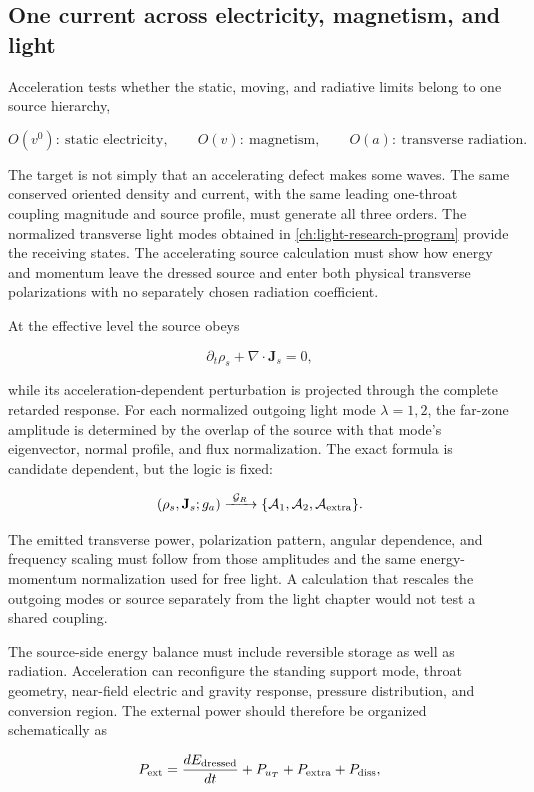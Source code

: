 \subsection{One current across electricity, magnetism, and light}

Acceleration tests whether the static, moving, and radiative limits belong to
one source hierarchy,

\[
O(v^0):\ \text{static electricity},
\qquad
O(v):\ \text{magnetism},
\qquad
O(a):\ \text{transverse radiation}.
\]

The target is not simply that an accelerating defect makes some waves. The same
conserved oriented density and current, with the same leading one-throat
coupling magnitude and source profile, must generate all three orders. The
normalized transverse light modes obtained in
\cref{ch:light-research-program} provide the receiving states. The accelerating
source calculation must show how energy and momentum leave the dressed source
and enter both physical transverse polarizations with no separately chosen
radiation coefficient.

At the effective level the source obeys

\[
\partial_t\rho_s+\nabla\cdot\mathbf J_s=0,
\]

while its acceleration-dependent perturbation is projected through the complete
retarded response. For each normalized outgoing light mode \(\lambda=1,2\),
the far-zone amplitude is determined by the overlap of the source with that
mode's eigenvector, normal profile, and flux normalization. The exact formula is
candidate dependent, but the logic is fixed:

\[
(\rho_s,\mathbf J_s;g_a)
\xrightarrow{\ \mathcal G_R\ }
\{\mathcal A_1,\mathcal A_2,\mathcal A_{\rm extra}\}.
\]

The emitted transverse power, polarization pattern, angular dependence, and
frequency scaling must follow from those amplitudes and the same energy-momentum
normalization used for free light. A calculation that rescales the outgoing
modes or source separately from the light chapter would not test a shared
coupling.

The source-side energy balance must include reversible storage as well as
radiation. Acceleration can reconfigure the standing support mode, throat
geometry, near-field electric and gravity response, pressure distribution, and
conversion region. The external power should therefore be organized
schematically as

\[
P_{\rm ext}
=
\frac{dE_{\rm dressed}}{dt}
+P_{u_T}
+P_{\rm extra}
+P_{\rm diss},
\]

